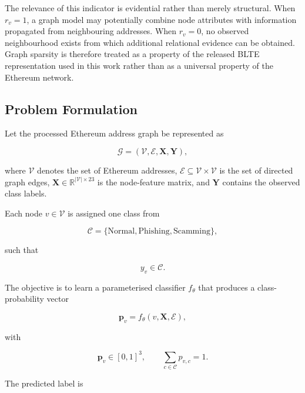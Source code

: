 \documentclass{ieeeaccess}
\begin{document}
The relevance of this indicator is evidential rather than merely structural. When $r_v=1$, a graph model may potentially combine node attributes with information propagated from neighbouring addresses. When $r_v=0$, no observed neighbourhood exists from which additional relational evidence can be obtained. Graph sparsity is therefore treated as a property of the released BLTE representation used in this work rather than as a universal property of the Ethereum network.

\subsection{Problem Formulation}

Let the processed Ethereum address graph be represented as

\begin{equation}
\mathcal{G}
=
(\mathcal{V},\mathcal{E},\mathbf{X},\mathbf{Y}),
\end{equation}

where $\mathcal{V}$ denotes the set of Ethereum addresses, $\mathcal{E}\subseteq\mathcal{V}\times\mathcal{V}$ is the set of directed graph edges, $\mathbf{X}\in\mathbb{R}^{|\mathcal{V}|\times23}$ is the node-feature matrix, and $\mathbf{Y}$ contains the observed class labels.

Each node $v\in\mathcal{V}$ is assigned one class from

\begin{equation}
\mathcal{C}
=
\{
\mathrm{Normal},
\mathrm{Phishing},
\mathrm{Scamming}
\},
\end{equation}

such that

\begin{equation}
y_v\in\mathcal{C}.
\end{equation}

The objective is to learn a parameterised classifier $f_{\theta}$ that produces a class-probability vector

\begin{equation}
\mathbf{p}_v
=
f_{\theta}
\left(
v,\mathbf{X},\mathcal{E}
\right),
\end{equation}

with

\begin{equation}
\mathbf{p}_v\in[0,1]^3,
\qquad
\sum_{c\in\mathcal{C}}p_{v,c}=1.
\end{equation}

The predicted label is
\end{document}
